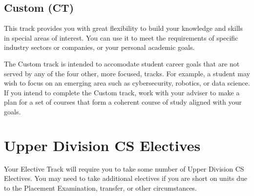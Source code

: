 \documentclass{book}
\newcommand{\cttrackname}{Custom (CT)}
\begin{document}
\subsection{\cttrackname}
\cttrackindex

This track provides you with great flexibility to build your knowledge and skills in special areas of interest. You can use it to meet the requirements of specific industry sectors or companies, or your personal academic goals.

The Custom track is intended to accomodate student career goals that are not served by any of the four other, more focused, tracks. For example, a student may wish to focus on an emerging area such as cybersecurity, robotics, or data science. If you intend to complete the Custom track, work with your adviser to make a plan for a set of courses that form a coherent course of study aligned with your goals.

\section{Upper Division CS Electives}
\label{section:upper_division_cs_electives}

Your Elective Track will require you to take some number of Upper Division CS Electives. You may need to take additional electives if you are short on units due to the Placement Examination, transfer, or other circumstances.
\end{document}
